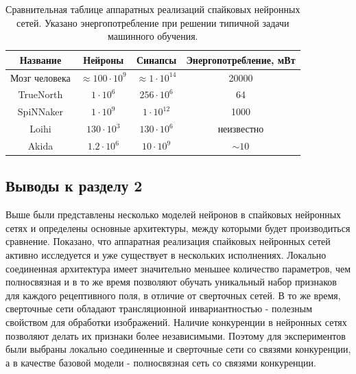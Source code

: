 \documentclass[a4paper]{article}
\begin{document}
\begin{table}[h]
 \caption {Сравнительная таблице аппаратных реализаций спайковых нейронных сетей. Указано энергопотребление при решении типичной задачи машинного обучения.}
 \begin{center}
  \begin{tabular}{|c|c|c|c|}
  \hline
  {Название} & {Нейроны} & {Синапсы} & {Энергопотребление, мВт}\\
  \hline
  {Мозг человека} & {$\approx 100 \cdot 10^9$} & {$\approx 1 \cdot 10^{14}$} & {20000}\\
  \hline
  {TrueNorth \cite{TrueNorth}} & {$1 \cdot 10^6$} & {$256 \cdot 10^6$} & {64\footnotemark[1]}\\
  \hline
  {SpiNNaker \cite{SpiNNaker}} & {$1 \cdot 10^9$} & {$1 \cdot 10^{12}$} & {1000\footnotemark[2]}\\
  \hline
  {Loihi \cite{Loihi}} & {$130 \cdot 10^3$} & {$130 \cdot 10^{6}$} & {неизвестно}\\
  \hline
  {Akida \cite{Akida}} & {$1.2 \cdot 10^6$} & {$10 \cdot 10^{9}$} & {$\sim 10$ \footnotemark[3]}\\
  \hline 
  \end{tabular}
 \end{center}
\end{table}


\subsection*{Выводы к разделу 2}
Выше были представлены несколько моделей нейронов в спайковых нейронных сетях и определены основные архитектуры, между которыми будет производиться сравнение. Показано, что аппаратная реализация спайковых нейронных сетей активно исследуется и уже существует в нескольких исполнениях. Локально соединенная архитектура имеет значительно меньшее количество параметров, чем полносвязная и в то же время позволяют обучать уникальный набор признаков для каждого рецептивного поля, в отличие от сверточных сетей. В то же время, сверточные сети обладают трансляционной инвариантностью - полезным свойством для обработки изображений. Наличие конкуренции в нейронных сетях позволяют делать их признаки более независимыми. Поэтому для экспериментов были выбраны локально соединенные и сверточные сети со связями конкуренции, а в качестве базовой модели - полносвязная сеть со связями конкуренции.
\end{document}
